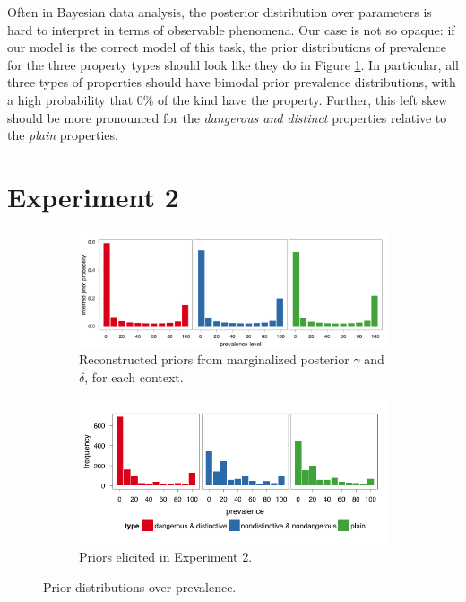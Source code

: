 \documentclass[10pt,letterpaper]{article}
\begin{document}
Often in Bayesian data analysis, the posterior distribution over parameters is hard to interpret in terms of observable phenomena. Our case is not so opaque: if our model is the correct model of this task, the prior distributions of prevalence for the three property types should look like they do in Figure \ref{fig:inferredpriors}. 
In particular, all three types of properties should have bimodal prior prevalence distributions, with a high probability that 0\% of the kind have the property. Further, this left skew should be more pronounced for the \emph{dangerous and distinct} properties relative to the \emph{plain} properties. 

\section{Experiment 2}

\begin{figure}
        \centering
        \begin{subfigure}[b]{\columnwidth}
    			\includegraphics[width=\columnwidth]{inferred_marginalized_priors}
                \caption{Reconstructed priors from marginalized posterior $\gamma$ and $\delta$, for each context.}
                \label{fig:inferredpriors}
        \end{subfigure}%
        
        
        \begin{subfigure}[b]{\columnwidth}
                \includegraphics[width=\columnwidth]{exp2_elicited_combined}
                \caption{Priors elicited in Experiment 2.}
                \label{fig:elicitedpriors}
        \end{subfigure}
        \caption{Prior distributions over prevalence.}\label{fig:priors}
\end{figure}
\end{document}
